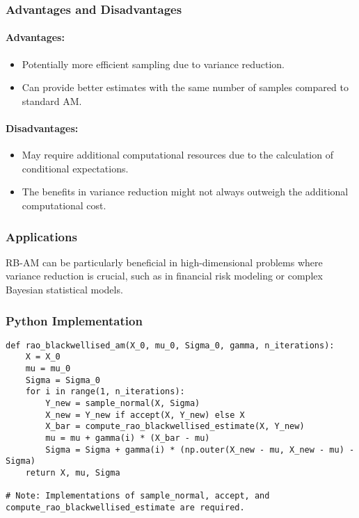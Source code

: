\documentclass{article}
\begin{document}
\subsubsection{Advantages and Disadvantages}
\paragraph{Advantages:}
\begin{itemize}
    \item Potentially more efficient sampling due to variance reduction.
    \item Can provide better estimates with the same number of samples compared to standard AM.
\end{itemize}

\paragraph{Disadvantages:}
\begin{itemize}
    \item May require additional computational resources due to the calculation of conditional expectations.
    \item The benefits in variance reduction might not always outweigh the additional computational cost.
\end{itemize}

\subsubsection{Applications}
RB-AM can be particularly beneficial in high-dimensional problems where variance reduction is crucial, such as in financial risk modeling or complex Bayesian statistical models.

\subsubsection{Python Implementation}
\begin{verbatim}
def rao_blackwellised_am(X_0, mu_0, Sigma_0, gamma, n_iterations):
    X = X_0
    mu = mu_0
    Sigma = Sigma_0
    for i in range(1, n_iterations):
        Y_new = sample_normal(X, Sigma)
        X_new = Y_new if accept(X, Y_new) else X
        X_bar = compute_rao_blackwellised_estimate(X, Y_new)
        mu = mu + gamma(i) * (X_bar - mu)
        Sigma = Sigma + gamma(i) * (np.outer(X_new - mu, X_new - mu) - Sigma)
    return X, mu, Sigma

# Note: Implementations of sample_normal, accept, and compute_rao_blackwellised_estimate are required.
\end{verbatim}
\end{document}

